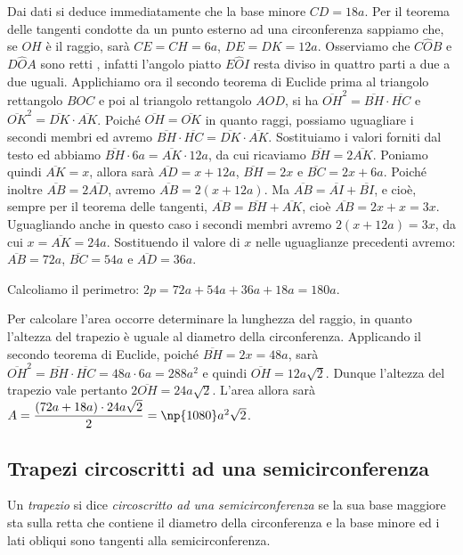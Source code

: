 \begin{exrig}
\begin{esempio}
Dai dati si deduce immediatamente che la base minore $CD = 18a$.
Per il teorema delle tangenti condotte da un punto esterno ad una circonferenza sappiamo che, se $OH$ è il raggio, sarà $CE=CH=6a$, $DE=DK=12a$.
Osserviamo che $C\widehat{O}B$ e $D\widehat{O}A$ sono retti , infatti l'angolo piatto $E\widehat{O}I$ resta diviso in quattro parti a due a due uguali.
Applichiamo ora il secondo teorema di Euclide prima al triangolo rettangolo $BOC$ e poi al triangolo rettangolo $AOD$, si ha $\overline{OH}^2=\overline{BH}\cdot\overline{HC}$ e $\overline{OK}^2=\overline{DK}\cdot\overline{AK}$.
Poiché $\overline{OH}=\overline{OK}$ in quanto raggi, possiamo uguagliare i secondi membri ed avremo $\overline{BH}\cdot\overline{HC}=\overline{DK}\cdot\overline{AK}$. Sostituiamo i valori forniti dal testo ed abbiamo $\overline{BH}\cdot 6a=\overline{AK}\cdot 12a$, da cui ricaviamo $\overline{BH}=2\overline{AK}$. Poniamo quindi $\overline{AK} = x$, allora sarà $\overline{AD}=x+12a$, $\overline{BH}=2x$ e $\overline{BC}=2x+6a$. Poiché inoltre $\overline{AB}=2\overline{AD}$, avremo $\overline{AB} = 2(x + 12a)$. Ma $\overline{AB}=\overline{AI}+\overline{BI}$, e cioè, sempre per il teorema delle tangenti, $\overline{AB}=\overline{BH}+\overline{AK}$, cioè $\overline{AB} = 2x + x = 3x$. Uguagliando anche in questo caso i secondi membri avremo $2(x+12a)=3x$, da cui $x = \overline{AK} = 24a$. Sostituendo il valore di $x$ nelle uguaglianze precedenti avremo: $\overline{AB}=72a$, $\overline{BC}=54a$ e $\overline{AD}=36a$. 

Calcoliamo il perimetro: $2p=72a+54a+36a+18a=180a$.

Per calcolare l'area occorre determinare la lunghezza del raggio, in quanto l'altezza del trapezio è uguale al diametro della circonferenza. Applicando il secondo teorema di Euclide, poiché $\overline{BH}=2x=48a$, sarà $\overline{OH}^2=\overline{BH}\cdot\overline{HC}=48a\cdot 6a=288a^2$ e quindi $\overline{OH}=12a\sqrt{2}$. Dunque l'altezza del trapezio vale pertanto $2\overline{OH}=24a\sqrt{2}$. L'area allora sarà $A=\dfrac{(72a+18a)\cdot 24a\sqrt{2}}{2}=\np{1080}a^2\sqrt{2}$.
\end{esempio}
\end{exrig}

\subsection{Trapezi circoscritti ad una semicirconferenza}

\begin{definizione}
Un \emph{trapezio} si dice \emph{circoscritto ad una semicirconferenza} se la sua base maggiore sta sulla retta che contiene il diametro della circonferenza e la base minore ed i lati obliqui sono tangenti alla semicirconferenza.
\end{definizione}

